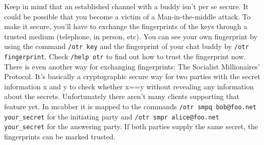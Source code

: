 \documentclass[12pt,oneside,a4]{book}
\begin{document}
Keep in mind that an established channel with a buddy isn't per se secure. It
could be possible that you become a victim of a Man-in-the-middle attack. To
make it secure, you'll have to exchange the fingerprints of the keys through
a trusted medium (telephone, in person, etc). You can see your own fingerprint
by using the command \verb+/otr key+ and the fingerprint of your chat buddy by
\verb+/otr fingerprint+. Check \verb+/help otr+ to find out how to trust the fingerprint now.
There is even another way for exchanging fingerprints: The Socialist Millionaires'
Protocol\cite{smp}. It's basically a cryptographic secure way for two parties with the
secret information x and y to check whether x==y without revealing any
information about the secrets. Unfortunately there aren't many clients
supporting that feature yet. In mcabber it is mapped to the commands
\verb+/otr smpq bob@foo.net your_secret+ for the initiating party and
\verb+/otr smpr alice@foo.net your_secret+ for the answering party. If both parties supply
the same secret, the fingerprints can be marked trusted.


\end{document}
